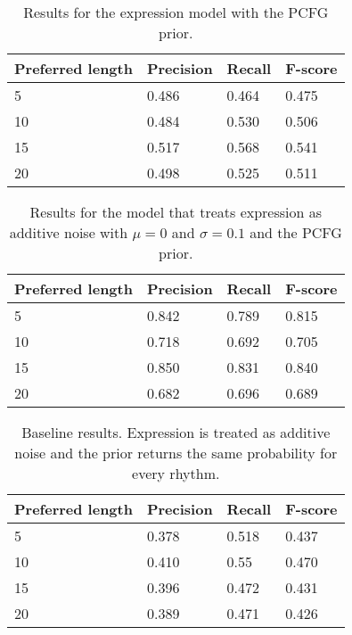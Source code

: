 \begin{table}
\centering
\caption{Results for the expression model with the PCFG prior.}
\label{tab:results1}
\begin{tabular}{llll}
\hline
\textbf{Preferred length} & \textbf{Precision} & \textbf{Recall} & \textbf{F-score}\\
\hline
\hline
5 & 0.486 & 0.464 & 0.475\\
10 & 0.484 & 0.530 & 0.506\\
15 & 0.517 & 0.568 & 0.541\\
20 & 0.498 & 0.525 & 0.511\\
\hline
\end{tabular}
\end{table}

\begin{table}
\centering
\caption{Results for the model that treats expression as additive noise with $\mu = 0$ and $\sigma = 0.1$ and the PCFG prior.}
\label{tab:results2}
\begin{tabular}{llll}
\hline
\textbf{Preferred length} & \textbf{Precision} & \textbf{Recall} & \textbf{F-score}\\
\hline
\hline
5 & 0.842 & 0.789 & 0.815\\
10 & 0.718 & 0.692 & 0.705\\
15 & 0.850 & 0.831 & 0.840\\
20 & 0.682 & 0.696 & 0.689\\
\hline
\end{tabular}
\end{table}

\begin{table}
\centering
\caption{Baseline results. Expression is treated as additive noise and the prior returns the same probability for every rhythm.}
\label{tab:results3}
\begin{tabular}{llll}
\hline
\textbf{Preferred length} & \textbf{Precision} & \textbf{Recall} & \textbf{F-score}\\
\hline
\hline
5 & 0.378 & 0.518 & 0.437\\
10 & 0.410 & 0.55 & 0.470\\
15 & 0.396 & 0.472 & 0.431\\
20 & 0.389 & 0.471 & 0.426\\
\hline
\end{tabular}
\end{table}